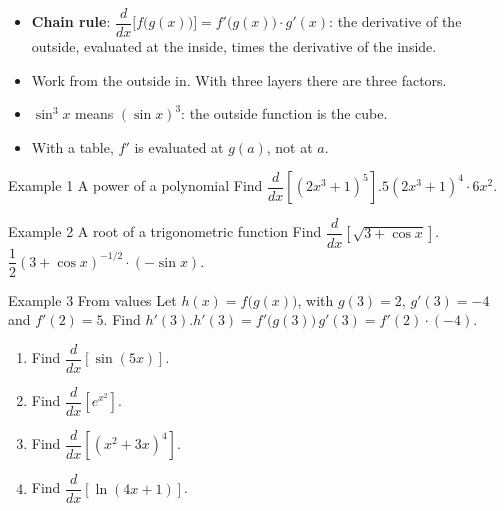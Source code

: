 \documentclass[11pt]{article}
\begin{document}

\begin{ideabox}
\begin{itemize}[leftmargin=*,itemsep=2pt,topsep=2pt]
  \item \textbf{Chain rule}: $\dfrac{d}{dx}\Big[f\big(g(x)\big)\Big]=f'\big(g(x)\big)\cdot g'(x)$: the derivative of the outside, evaluated at the inside, times the derivative of the inside.
  \item Work from the outside in. With three layers there are three factors.
  \item $\sin^3x$ means $(\sin x)^3$: the outside function is the cube.
  \item With a table, $f'$ is evaluated at $g(a)$, not at $a$.
\end{itemize}
\end{ideabox}

\begin{example}{Example 1 \textperiodcentered{} A power of a polynomial}
Find $\dfrac{d}{dx}\left[\left(2x^3+1\right)^5\right]$.\soln $5\left(2x^3+1\right)^4\cdot6x^2$.
\end{example}

\begin{example}{Example 2 \textperiodcentered{} A root of a trigonometric function}
Find $\dfrac{d}{dx}\left[\sqrt{3+\cos x}\right]$.\soln $\dfrac12(3+\cos x)^{-1/2}\cdot(-\sin x)$.
\end{example}

\begin{example}{Example 3 \textperiodcentered{} From values}
Let $h(x)=f\big(g(x)\big)$, with $g(3)=2$, $g'(3)=-4$ and $f'(2)=5$. Find $h'(3)$.\soln $h'(3)=f'\big(g(3)\big)\,g'(3)=f'(2)\cdot(-4)$.
\end{example}

\newpage
{}

\begin{enumerate}[leftmargin=*,itemsep=2pt]
  \item Find $\dfrac{d}{dx}[\sin(5x)]$.\work{2.3cm}
  \item Find $\dfrac{d}{dx}\left[e^{x^2}\right]$.\work{2.3cm}
  \item Find $\dfrac{d}{dx}\left[\left(x^2+3x\right)^4\right]$.\work{2.3cm}
  \item Find $\dfrac{d}{dx}[\ln(4x+1)]$.\work{2.3cm}
\end{enumerate}
\end{document}
